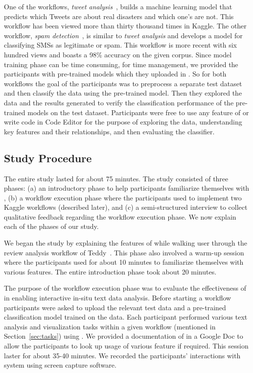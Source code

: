 One of the workflows, \emph{tweet analysis}~\cite{tweet}, builds a machine learning model that predicts which Tweets are about real disasters and which one’s are not. This workflow has been viewed more than thirty thousand times in Kaggle. The other workflow, \emph{spam detection}~\cite{spam}, is similar to \emph{tweet analysis} and develops a model for classifying SMSs as legitimate or spam. This workflow is more recent with six hundred views and boasts a 98\% accuracy on the given corpus. Since model training phase can be time consuming, for time management, we provided the participants with pre-trained models which they uploaded in \system. So for both workflows the goal of the participants was to preprocess a separate test dataset and then classify the data using the pre-trained model. Then they explored the data and the results generated to verify the classification performance of the pre-trained models on the test dataset. Participants were free to use any feature of \system or write code in Code Editor for the purpose of exploring the data, understanding key features and their relationships, and then evaluating the classifier. 

\subsection{Study Procedure}
\label{sec:procedure}
The entire study lasted for about 75 minutes.
The study consisted of three phases: 
(a) an introductory phase to help participants familiarize themselves with \system,
(b) a workflow execution phase where the participants used \system to implement two Kaggle workflows (described later), and
(c) a semi-structured interview to collect qualitative feedback regarding the workflow execution phase. 
We now explain each of the phases of our study.
 
We began the study by 
explaining the features of \system while walking user through
the review analysis workflow of Teddy~\cite{zhang2020teddy}. 
This phase also involved a  warm-up session where the participants 
used \system
for about 10 minutes to 
familiarize themselves with various features. The entire 
introduction phase took about 20 minutes.

The purpose of the workflow execution phase was to evaluate the effectiveness of \system 
in enabling interactive in-situ text data analysis. 
Before starting a workflow participants
were asked to upload the relevant test data and
a pre-trained classification
model trained on the data. 
Each participant performed various
text analysis and visualization
tasks within a given workflow (mentioned in Section~\ref{sec:tasks}) using \system. 
We provided a documentation of \system
in a Google Doc to allow the
participants to look up usage of various
\system feature if required.
This session laster for about 35-40 minutes.
We recorded the participants' interactions
with system using screen capture software. 

